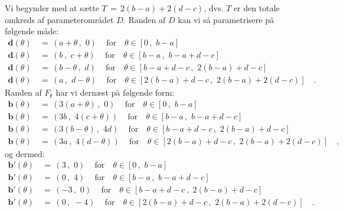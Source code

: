 \begin{example}
Vi begynder med at sætte $T \, = \, 2(b-a) + 2(d-c)$, dvs. $T$ er den totale omkreds af parameterområdet $D$. Randen af $D$ kan vi så parametrisere på følgende måde:
\begin{equation}
\begin{aligned}
\mathbf{d}(\theta) \, &= \, (a + \theta \, , \,\, 0)\, \quad \textrm{for} \quad \theta \in [0\, , \,\, b-a] \\
\mathbf{d}(\theta) \, &= \, (b \, , \,\, c + \theta)\, \quad \textrm{for} \quad \theta \in [b-a\, , \,\, b-a + d-c] \\
\mathbf{d}(\theta) \, &= \, (b - \theta\, , \,\, d)\, \quad \textrm{for} \quad \theta \in [b-a + d-c\, , \,\, 2(b-a) + d-c] \\
\mathbf{d}(\theta) \, &= \, (a\, , \,\, d - \theta)\, \quad \textrm{for} \quad \theta \in [2(b-a) + d-c\, , \,\, 2(b-a) + 2(d-c)] \quad .
\end{aligned}
\end{equation}
Randen af $F_{\mathbf{r}}$ har vi dernæst på følgende form:
\begin{equation}
\begin{aligned}
\mathbf{b}(\theta) \, &= \, (3(a + \theta) \, , \,\, 0)\, \quad \textrm{for} \quad \theta \in [0\, , \,\, b-a] \\
\mathbf{b}(\theta) \, &= \, (3b \, , \,\, 4(c + \theta))\, \quad \textrm{for} \quad \theta \in [b-a\, , \,\, b-a + d-c] \\
\mathbf{b}(\theta) \, &= \, (3(b - \theta)\, , \,\, 4d)\, \quad \textrm{for} \quad \theta \in [b-a + d-c\, , \,\, 2(b-a) + d-c] \\
\mathbf{b}(\theta) \, &= \, (3a\, , \,\, 4(d - \theta))\, \quad \textrm{for} \quad \theta \in [2(b-a) + d-c\, , \,\, 2(b-a) + 2(d-c)] \quad ,
\end{aligned}
\end{equation}
og dermed:
\begin{equation}
\begin{aligned}
\mathbf{b}'(\theta) \, &= \, (3 \, , \,\, 0)\, \quad \textrm{for} \quad \theta \in [0\, , \,\, b-a] \\
\mathbf{b}'(\theta) \, &= \, (0 \, , \,\, 4)\, \quad \textrm{for} \quad \theta \in [b-a\, , \,\, b-a + d-c] \\
\mathbf{b}'(\theta) \, &= \, (-3\, , \,\, 0)\, \quad \textrm{for} \quad \theta \in [b-a + d-c\, , \,\, 2(b-a) + d-c] \\
\mathbf{b}'(\theta) \, &= \, (0\, , \,\, -4)\, \quad \textrm{for} \quad \theta \in [2(b-a) + d-c\, , \,\, 2(b-a) + 2(d-c)] \quad .
\end{aligned}
\end{equation}




\end{example}
